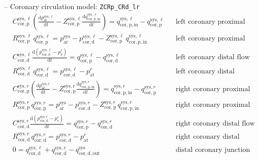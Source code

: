 \documentclass[a4paper,12pt]{report}
\begin{document}
-- Coronary circulation model: \verb"ZCRp_CRd_lr"\\
\begin{equation}
\begin{aligned}
&C_{\mathrm{cor,p}}^{\mathrm{sys},\ell} \left(\frac{\mathrm{d}p_{\mathrm{ar}}^{\mathrm{sys},\ell}}{\mathrm{d}t}-Z_{\mathrm{cor,p}}^{\mathrm{sys},\ell}\frac{\mathrm{d}q_{\mathrm{cor,p,in}}^{\mathrm{sys},\ell}}{\mathrm{d}t}\right) = q_{\mathrm{cor,p,in}}^{\mathrm{sys},\ell} - q_{\mathrm{cor,p}}^{\mathrm{sys},\ell} && \text{left coronary proximal flow balance}\\
&R_{\mathrm{cor,p}}^{\mathrm{sys},\ell}\,q_{\mathrm{cor,p}}^{\mathrm{sys},\ell}=p_{\mathrm{ar}}^{\mathrm{sys}}-p_{\mathrm{cor,d}}^{\mathrm{sys},\ell} - Z_{\mathrm{cor,p}}^{\mathrm{sys},\ell}\,q_{\mathrm{cor,p,in}}^{\mathrm{sys},\ell} && \text{left coronary proximal momentum}\\
&C_{\mathrm{cor,d}}^{\mathrm{sys},\ell} \frac{\mathrm{d}(p_{\mathrm{cor,d}}^{\mathrm{sys},\ell}-p_{\mathrm{v}}^{\ell})}{\mathrm{d}t} = q_{\mathrm{cor,p}}^{\mathrm{sys},\ell} - q_{\mathrm{cor,d}}^{\mathrm{sys},\ell} && \text{left coronary distal flow balance}\\
&R_{\mathrm{cor,d}}^{\mathrm{sys},\ell}\,q_{\mathrm{cor,d}}^{\mathrm{sys},\ell}=p_{\mathrm{cor,d}}^{\mathrm{sys},\ell}-p_{\mathrm{at}}^{r} && \text{left coronary distal momentum}\\
&C_{\mathrm{cor,p}}^{\mathrm{sys},r} \left(\frac{\mathrm{d}p_{\mathrm{ar}}^{\mathrm{sys},r}}{\mathrm{d}t}-Z_{\mathrm{cor,p}}^{\mathrm{sys},r}\frac{\mathrm{d}q_{\mathrm{cor,p,in}}^{\mathrm{sys},r}}{\mathrm{d}t}\right) = q_{\mathrm{cor,p,in}}^{\mathrm{sys},r} - q_{\mathrm{cor,p}}^{\mathrm{sys},r} && \text{right coronary proximal flow balance}\\
&R_{\mathrm{cor,p}}^{\mathrm{sys},r}\,q_{\mathrm{cor,p}}^{\mathrm{sys},r}=p_{\mathrm{ar}}^{\mathrm{sys}}-p_{\mathrm{cor,d}}^{\mathrm{sys},r} - Z_{\mathrm{cor,p}}^{\mathrm{sys},r}\,q_{\mathrm{cor,p,in}}^{\mathrm{sys},r} && \text{right coronary proximal momentum}\\
&C_{\mathrm{cor,d}}^{\mathrm{sys},r} \frac{\mathrm{d}(p_{\mathrm{cor,d}}^{\mathrm{sys},r}-p_{\mathrm{v}}^{\ell})}{\mathrm{d}t} = q_{\mathrm{cor,p}}^{\mathrm{sys},r} - q_{\mathrm{cor,d}}^{\mathrm{sys},r} && \text{right coronary distal flow balance}\nonumber\\
&R_{\mathrm{cor,d}}^{\mathrm{sys},r}\,q_{\mathrm{cor,d}}^{\mathrm{sys},r}=p_{\mathrm{cor,d}}^{\mathrm{sys},r}-p_{\mathrm{at}}^{r} && \text{right coronary distal momentum}\\
&0=q_{\mathrm{cor,d}}^{\mathrm{sys},\ell}+q_{\mathrm{cor,d}}^{\mathrm{sys},r}-q_{\mathrm{cor,d,out}}^{\mathrm{sys}} && \text{distal coronary junction flow balance}
\end{aligned}
\end{equation}
\end{document}
